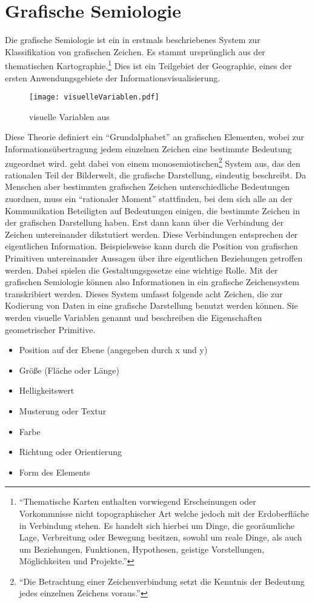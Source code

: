 \documentclass[a4paper, 12pt, DIVcalc, onepage, pdftex, headsepline, footsepline]{scrreprt}
\begin{document}
\section{Grafische Semiologie}
\label{sec:grafischeSemiologie}
Die grafische Semiologie ist ein in \citep{Bertin} erstmals beschriebenes System zur Klassifikation von grafischen Zeichen.
Es stammt ursprünglich aus der thematischen Kartographie.\footnote{"`Thematische Karten enthalten vorwiegend
Erscheinungen oder Vorkommnisse nicht topographischer Art welche jedoch mit der Erdoberfläche in Verbindung
stehen. Es handelt sich hierbei um Dinge, die georäumliche Lage, Verbreitung oder Bewegung besitzen, sowohl
um reale Dinge, als auch um Beziehungen, Funktionen, Hypothesen, geistige Vorstellungen, Möglichkeiten und
Projekte."'\citep{Gitta} } Dies ist ein Teilgebiet der Geographie, eines der ersten Anwendungsgebiete der
Informationsvisualisierung.
\begin{figure}
\centering
\texttt{[image: visuelleVariablen.pdf]}
\caption{visuelle Variablen aus \citep[S.\,51]{Bertin}}
\label{fig:visuelleVariablen}
\end{figure}
Diese Theorie definiert ein "`Grundalphabet"' an grafischen Elementen, wobei zur Informationsübertragung
jedem einzelnen Zeichen eine bestimmte Bedeutung zugeordnet wird. \citep{Bertin} geht dabei von einem
monosemiotischen\footnote{"`Die Betrachtung einer Zeichenverbindung setzt die Kenntnis der Bedeutung jedes
einzelnen Zeichens voraus."'\citep[S.\,3]{Bertin}} System aus, das den rationalen Teil der Bilderwelt, die
grafische Darstellung, eindeutig beschreibt.
Da Menschen aber bestimmten grafischen Zeichen unterschiedliche Bedeutungen zuordnen, muss ein "`rationaler Moment"'
stattfinden, bei dem sich alle an der Kommunikation Beteiligten auf Bedeutungen einigen,
die bestimmte Zeichen in der grafischen Darstellung haben. Erst dann kann über die Verbindung der Zeichen untereinander dikstutiert
werden. Diese Verbindungen entsprechen der eigentlichen Information. Beispielsweise kann
durch die Position von grafischen Primitiven untereinander Aussagen über ihre eigentlichen Beziehungen getroffen werden.
Dabei spielen die Gestaltungsgesetze eine wichtige Rolle.
Mit der grafischen Semiologie können also Informationen in ein grafische Zeichensystem
transkribiert werden. Dieses System umfasst folgende acht Zeichen, die zur Kodierung von Daten in eine grafische Darstellung benutzt
werden können. Sie werden visuelle Variablen genannt und beschreiben die Eigenschaften geometrischer Primitive.
\begin{itemize}
\item Position auf der Ebene (angegeben durch x und y)
\item Größe (Fläche oder Länge)
\item Helligkeitswert
\item Musterung oder Textur
\item Farbe
\item Richtung oder Orientierung
\item Form des Elements
\end{itemize}
\end{document}

